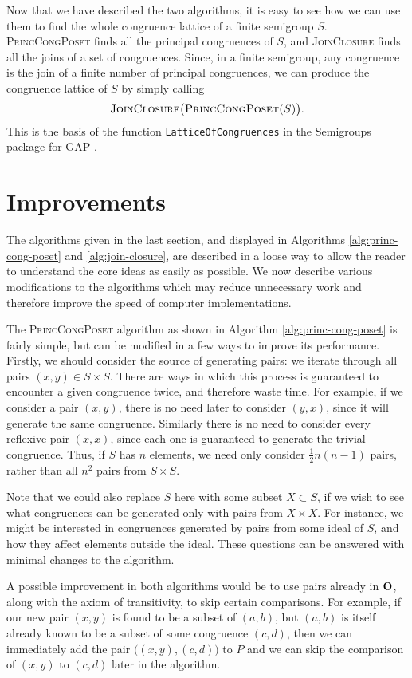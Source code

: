 Now that we have described the two algorithms, it is easy to see how we can use
them to find the whole congruence lattice of a finite semigroup $S$.
\textsc{PrincCongPoset} finds all the principal congruences of $S$, and
\textsc{JoinClosure} finds all the joins of a set of congruences.  Since, in a
finite semigroup, any congruence is the join of a finite number of principal
congruences, we can produce the congruence lattice of $S$ by simply calling
$$\textsc{JoinClosure\big(PrincCongPoset($S$)\big)}.$$  This is the basis of the
function \texttt{LatticeOfCongruences} in the Semigroups package for GAP
\cite{semigroups}.

\section{Improvements}
\label{sec:lattice-improvements}

The algorithms given in the last section, and displayed in Algorithms
\ref{alg:princ-cong-poset} and \ref{alg:join-closure}, are described in a loose
way to allow the reader to understand the core ideas as easily as possible.  We
now describe various modifications to the algorithms which may reduce
unnecessary work and therefore improve the speed of computer implementations.

The \textsc{PrincCongPoset} algorithm as shown in Algorithm
\ref{alg:princ-cong-poset} is fairly simple, but can be modified in a few ways
to improve its performance.  Firstly, we should consider the source of
generating pairs: we iterate through all pairs $(x,y) \in S \times S$.  There
are ways in which this process is guaranteed to encounter a given congruence
twice, and therefore waste time.  For example, if we consider a pair $(x,y)$,
there is no need later to consider $(y,x)$, since it will generate the same
congruence.  Similarly there is no need to consider every reflexive pair
$(x,x)$, since each one is guaranteed to generate the trivial congruence.  Thus,
if $S$ has $n$ elements, we need only consider $\frac{1}{2}n(n-1)$ pairs, rather
than all $n^2$ pairs from $S \times S$.

Note that we could also replace $S$ here with some subset $X \subset S$, if we
wish to see what congruences can be generated only with pairs from $X \times X$.
For instance, we might be interested in congruences generated by pairs from some
ideal of $S$, and how they affect elements outside the ideal.  These questions
can be answered with minimal changes to the algorithm.

A possible improvement in both algorithms would be to use pairs already in
$\mathbf{O}$, along with the axiom of transitivity, to skip certain comparisons.  For
example, if our new pair $(x,y)$ is found to be a subset of $(a,b)$, but $(a,b)$
is itself already known to be a subset of some congruence $(c,d)$, then we can
immediately add the pair $\big((x,y), (c,d)\big)$ to $P$ and we can skip the
comparison of $(x,y)$ to $(c,d)$ later in the algorithm.

